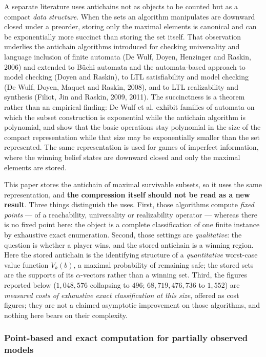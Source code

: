 \documentclass[10pt,twocolumn]{article}
\theoremstyle{plain}
\theoremstyle{definition}
\theoremstyle{remark}
\begin{document}
A separate literature uses antichains not as objects to be counted but as a compact
\emph{data structure}. When the sets an algorithm manipulates are downward closed under a
preorder, storing only the maximal elements is canonical and can be exponentially more succinct
than storing the set itself. That observation underlies the antichain algorithms introduced for
checking universality and language inclusion of finite automata (De Wulf, Doyen, Henzinger and
Raskin, 2006) and extended to B\"uchi automata and the automata-based approach to model
checking (Doyen and Raskin), to LTL satisfiability and model checking (De Wulf, Doyen, Maquet
and Raskin, 2008), and to LTL realizability and synthesis (Filiot, Jin and Raskin, 2009, 2011).
The succinctness is a theorem rather than an empirical finding: De Wulf et al. exhibit families
of automata on which the subset construction is exponential while the antichain algorithm is
polynomial, and show that the basic operations stay polynomial in the size of the compact
representation while that size may be exponentially smaller than the set represented. The same
representation is used for games of imperfect information, where the winning belief states are
downward closed and only the maximal elements are stored.

This paper stores the antichain of maximal survivable subsets, so it uses the same
representation, and \textbf{the compression itself should not be read as a new result}. Three
things distinguish the uses. First, those algorithms compute \emph{fixed points} --- of a
reachability, universality or realizability operator --- whereas there is no fixed point here:
the object is a complete classification of one finite instance by exhaustive exact enumeration.
Second, those settings are \emph{qualitative}: the question is whether a player wins, and the
stored antichain is a winning region. Here the stored antichain is the identifying structure of
a \emph{quantitative} worst-case value function \(V_k(b)\), a maximal probability of remaining
safe; the stored sets are the supports of its \(\alpha\)-vectors rather than a winning set.
Third, the figures reported below (\(1{,}048{,}576\) collapsing to \(496\);
\(68{,}719{,}476{,}736\) to \(1{,}552\)) are \emph{measured costs of exhaustive exact
classification at this size}, offered as cost figures; they are not a claimed asymptotic
improvement on those algorithms, and nothing here bears on their complexity.

\subsubsection{Point-based and exact computation for partially observed models}
\end{document}
